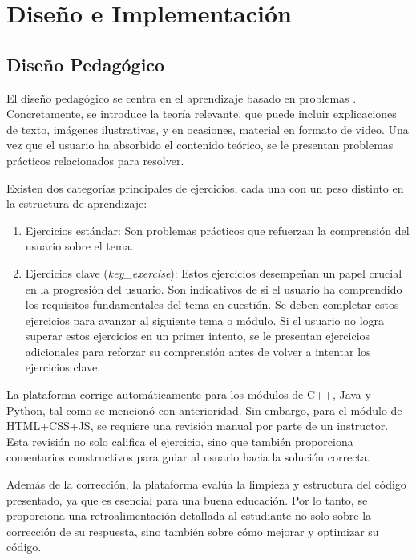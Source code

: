 \chapter{Diseño e Implementación} \label{chap:analisisExperimentación}


\section{Diseño Pedagógico}

El diseño pedagógico se centra en el aprendizaje basado en problemas \cite{de2008aprendizaje}. Concretamente, se introduce la teoría relevante, que puede incluir explicaciones de texto, imágenes ilustrativas, y en ocasiones, material en formato de video. Una vez que el usuario ha absorbido el contenido teórico, se le presentan problemas prácticos relacionados para resolver.

Existen dos categorías principales de ejercicios, cada una con un peso distinto en la estructura de aprendizaje:

\begin {enumerate}
\item Ejercicios estándar: Son problemas prácticos que refuerzan la comprensión del usuario sobre el tema.

\item Ejercicios clave (\textit{key\_exercise}): Estos ejercicios desempeñan un papel crucial en la progresión del usuario. Son indicativos de si el usuario ha comprendido los requisitos fundamentales del tema en cuestión. Se deben completar estos ejercicios para avanzar al siguiente tema o módulo. Si el usuario no logra superar estos ejercicios en un primer intento, se le presentan ejercicios adicionales para reforzar su comprensión antes de volver a intentar los ejercicios clave.
\end{enumerate}

La plataforma corrige automáticamente para los módulos de C++, Java y Python, tal como se mencionó con anterioridad. Sin embargo, para el módulo de HTML+CSS+JS, se requiere una revisión manual por parte de un instructor. Esta revisión no solo califica el ejercicio, sino que también proporciona comentarios constructivos para guiar al usuario hacia la solución correcta.

Además de la corrección, la plataforma evalúa la limpieza y estructura del código presentado, ya que es esencial para una buena educación. Por lo tanto, se proporciona una retroalimentación detallada al estudiante no solo sobre la corrección de su respuesta, sino también sobre cómo mejorar y optimizar su código.

